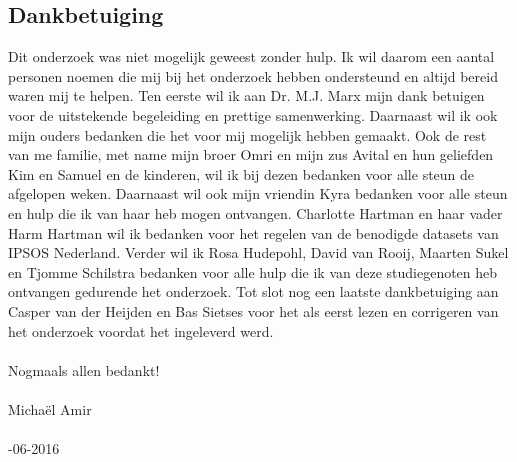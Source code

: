 \subsection{Dankbetuiging}
Dit onderzoek was niet mogelijk geweest zonder hulp. Ik wil daarom een aantal personen noemen die mij bij het onderzoek hebben ondersteund en altijd bereid waren mij te helpen. Ten eerste wil ik aan Dr. M.J. Marx mijn dank betuigen voor de uitstekende begeleiding en prettige samenwerking. Daarnaast wil ik ook mijn ouders bedanken die het voor mij mogelijk hebben gemaakt. Ook de rest van me familie, met name mijn broer Omri en mijn zus Avital en hun geliefden Kim en Samuel en de kinderen, wil ik bij dezen bedanken voor alle steun de afgelopen weken. Daarnaast wil ook mijn vriendin Kyra bedanken voor alle steun en hulp die ik van haar heb mogen ontvangen. Charlotte Hartman en haar vader Harm Hartman wil ik bedanken voor het regelen van de benodigde datasets van IPSOS Nederland. Verder wil ik Rosa Hudepohl, David van Rooij, Maarten Sukel en Tjomme Schilstra bedanken voor alle hulp die ik van deze studiegenoten heb ontvangen gedurende het onderzoek. Tot slot nog een laatste dankbetuiging aan Casper van der Heijden en Bas Sietses voor het als eerst lezen en corrigeren van het onderzoek voordat het ingeleverd werd.\\\\


\noindent Nogmaals allen bedankt! \\\\

\noindent Micha\"{e}l Amir\\\\

-06-2016\\\\





























\iffalse
